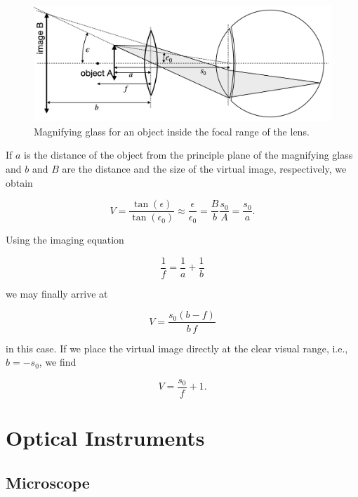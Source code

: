 \documentclass[
  a4paper,
]{book}
\begin{document}
\begin{figure}[H]

{\centering \includegraphics[width=0.6\linewidth,height=\textheight,keepaspectratio]{geometrical-optics/img/inside_focus.png}

}

\caption{Magnifying glass for an object inside the focal range of the
lens.}

\end{figure}%

If \(a\) is the distance of the object from the principle plane of the
magnifying glass and \(b\) and \(B\) are the distance and the size of
the virtual image, respectively, we obtain

\[
V=\frac{\tan(\epsilon)}{\tan(\epsilon_0)}\approx \frac{\epsilon}{\epsilon_0}=\frac{B}{b}\frac{s_0}{A}=\frac{s_0}{a}.
\]

Using the imaging equation

\[
\frac{1}{f}=\frac{1}{a}+\frac{1}{b}
\]

we may finally arrive at

\[
V=\frac{s_0(b-f)}{b\,f}
\]

in this case. If we place the virtual image directly at the clear visual
range, i.e., \(b=-s_0\), we find

\[
V=\frac{s_0}{f}+1.
\]

\chapter{Optical Instruments}\label{optical-instruments-2}

\section{Microscope}\label{microscope}
\end{document}
